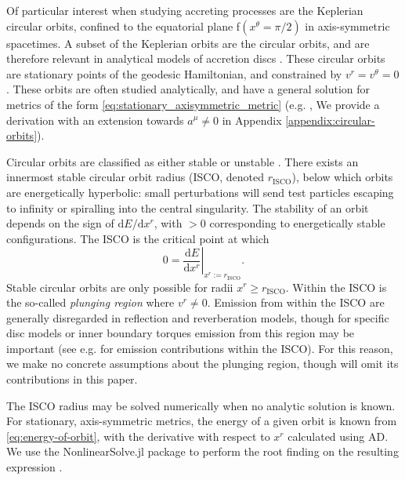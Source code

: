 \documentclass[fleqn,usenatbib]{mnras}
\renewcommand{\d}{\text{d}}
\newcommand{\risco}{r_\text{ISCO}}
\begin{document}
Of particular interest when studying accreting processes are the Keplerian
circular orbits, confined to the equatorial plane f$(x^\theta = \pi/2)$ in
axis-symmetric spacetimes. A subset of the Keplerian orbits are the circular
orbits, and are therefore relevant in analytical models of accretion discs
\citep{shakura_black_1973}. These circular orbits are stationary points of the
geodesic Hamiltonian, and constrained by $v^r = v^\theta = 0$.  These orbits are
often studied analytically, and have a general solution for metrics of the form
\eqref{eq:stationary_axisymmetric_metric} (e.g. \citealp{johannsen_regular_2013},
We provide a derivation with an extension towards $a^\mu \neq 0$ in Appendix
\ref{appendix:circular-orbits}).

Circular orbits are classified as either stable or unstable
\citep{wilkins_bound_1972,bardeen_rotating_1972}. There exists an innermost
stable circular orbit radius (ISCO, denoted $\risco$), below which orbits
are energetically hyperbolic: small perturbations will send test particles
escaping to infinity or spiralling into the central singularity. The stability of
an orbit depends on the sign of $\d E / \d x^r$, with $>0$ corresponding to
energetically stable configurations. The ISCO is the critical point at
which
\begin{equation}
    \label{eq:isco-definition}
    0 = \left. \frac{\d E}{\d x^r} \right\rvert_{x^r := \risco}.
\end{equation}
Stable circular orbits are only possible for radii $x^r \geq \risco$.  Within
the ISCO is the so-called \textit{plunging region} where $v^r \neq 0$.  Emission
from within the ISCO are generally disregarded in reflection and reverberation
models, though for specific disc models or inner boundary torques emission from
this region may be important (see e.g. \citealp{mummery_continuum_2024} for
emission contributions within the ISCO). For this reason, we make no concrete
assumptions about the plunging region, though will omit its contributions in
this paper.

The ISCO radius may be solved numerically when no analytic solution is known.
For stationary, axis-symmetric metrics, the energy of a given orbit is known from
\eqref{eq:energy-of-orbit}, with the derivative with respect to $x^r$
calculated using AD. We use the NonlinearSolve.jl package to perform the root
finding on the resulting expression \citep{Pal_NonlinearSolve_jl_2023}.
\end{document}
